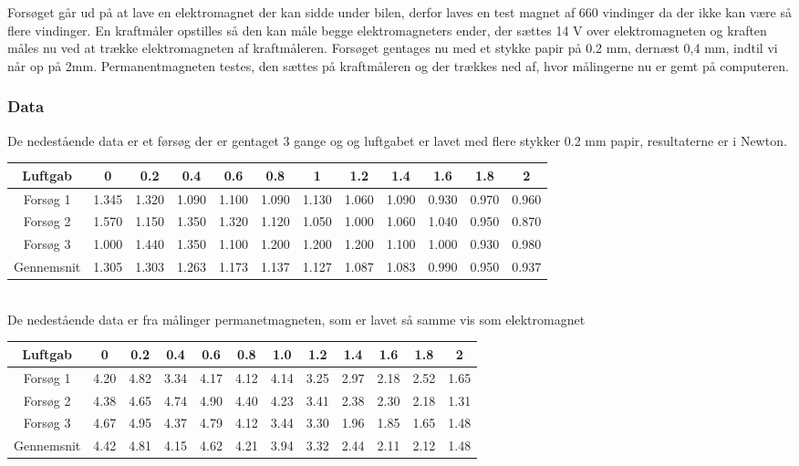 Forsøget går ud på at lave en elektromagnet der kan sidde under bilen, derfor laves en test magnet af 660 vindinger da der ikke kan være så flere vindinger. En kraftmåler opstilles så den kan måle begge elektromagneters ender, der sættes 14 V over elektromagneten og kraften måles nu ved at trække elektromagneten af kraftmåleren. Forsøget gentages nu med et stykke papir på 0.2 mm, dernæst 0,4 mm, indtil vi når op på 2mm. Permanentmagneten testes, den sættes på kraftmåleren og der trækkes ned af, hvor målingerne nu er gemt på computeren.



\subsubsection*{Data}
De nedestående data er et førsøg der er gentaget 3 gange og og luftgabet er lavet med flere stykker 0.2 mm papir, resultaterne er i Newton. \\

\begin{tabular}{|c|c|c|c|c|c|c|c|c|c|c|c|}
\hline 
Luftgab & 0 & 0.2 & 0.4 & 0.6 & 0.8 & 1 & 1.2 & 1.4 & 1.6 & 1.8 & 2 \\ 
\hline 
Forsøg 1 & 1.345 & 1.320 & 1.090 & 1.100 & 1.090 & 1.130 & 1.060 & 1.090 & 0.930 & 0.970 & 0.960 \\ 
\hline 
Forsøg 2 & 1.570 & 1.150 & 1.350 & 1.320 & 1.120 & 1.050 & 1.000 & 1.060 & 1.040 & 0.950 & 0.870 \\ 
\hline 
Forsøg 3 & 1.000 & 1.440 & 1.350 & 1.100 & 1.200 & 1.200 & 1.200 & 1.100 & 1.000 & 0.930 & 0.980 \\ 
\hline 
Gennemsnit & 1.305 & 1.303 & 1.263 & 1.173 & 1.137 & 1.127 & 1.087 & 1.083 & 0.990 & 0.950 & 0.937 \\ 
\hline 
\end{tabular}
\\
De nedestående data er fra målinger permanetmagneten, som er lavet så samme vis som elektromagnet\\

\begin{tabular}{|c|c|c|c|c|c|c|c|c|c|c|c|}
\hline
Luftgab & 0 & 0.2 & 0.4 & 0.6 & 0.8 & 1.0 & 1.2 & 1.4 & 1.6 & 1.8 & 2 \\
\hline
Forsøg 1 & 4.20 & 4.82 & 3.34 & 4.17 & 4.12 & 4.14 & 3.25 & 2.97 & 2.18 & 2.52 & 1.65 \\
\hline
Forsøg 2 & 4.38 & 4.65 & 4.74 & 4.90 & 4.40 & 4.23 & 3.41 & 2.38 & 2.30 & 2.18 & 1.31 \\
\hline
Forsøg 3 & 4.67 & 4.95 & 4.37 & 4.79 & 4.12 & 3.44 & 3.30 & 1.96 & 1.85 & 1.65 & 1.48 \\
\hline 
Gennemsnit & 4.42 & 4.81 & 4.15 & 4.62 & 4.21 & 3.94 & 3.32 & 2.44 & 2.11 & 2.12 & 1.48 \\
\hline
\end{tabular} 

